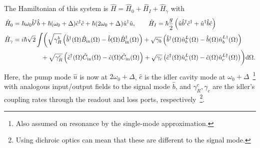 The Hamiltonian of this system is $\hat H = \hat H_0+\hat H_I+\hat H_\gamma$ with~\cite{schoriNarrowbandFrequencyTunable2002,reidDemonstrationEinsteinPodolskyRosenParadox1989}
\begin{align}
\hat H_0 &= \hbar \omega_0 \hat b^\dag \hat b + \hbar (\omega_0+\Delta) \hat c^\dag \hat c + \hbar (2\omega_0+\Delta) \hat u^\dag \hat u, \qquad \hat H_I = \hbar \frac{g}{2} \left(\hat u \hat b^\dag \hat c^\dag + \hat u^\dag \hat b \hat c \right)\\
\hat H_\gamma &= i\hbar \sqrt{2}\int \biggl( \sqrt{\gamma^b_R}\left(\hat{b}^\dag(\Omega)\hat{B}_\text{in}(\Omega)-\hat{b}(\Omega)\hat{B}_\text{in}^\dag(\Omega)\right) + \sqrt{\gamma_b}\left(\hat{b}^\dag(\Omega)\hat n^L_b(\Omega)-\hat{b}(\Omega)\hat{n}^{L\dag}_b(\Omega)\right) \nonumber \\
& \hspace*{1.55cm} + \sqrt{\gamma^c_R}\left(\hat{c}^\dag(\Omega)\hat C_\text{in}(\Omega)-\hat{c}(\Omega)\hat C_\text{in}(\Omega)\right) + \sqrt{\gamma_c}\left(\hat{c}^\dag(\Omega)\hat n^L_c(\Omega)-\hat{c}(\Omega)\hat{n}^{L\dag}_c(\Omega)\right)\biggr)\text{d}\Omega \nonumber.
\end{align}
Here, the pump mode $\hat u$ is now at $2\omega_0+\Delta$, $\hat c$ is the idler cavity mode at $\omega_0+\Delta$~\footnote{Also assumed on resonance by the single-mode approximation.} with analogous input/output fields to the signal mode $\hat b$,
and $\gamma^c_R,\gamma_c$ are the idler's coupling rates through the readout and loss ports, respectively~\footnote{Using dichroic optics can mean that these are different to the signal mode.}. %
